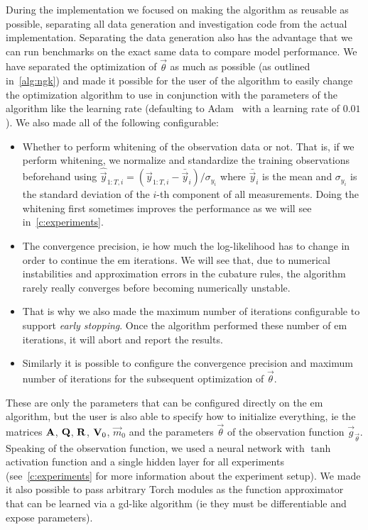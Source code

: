 	During the implementation we focused on making the algorithm as reusable as possible, separating all data generation and investigation code from the actual implementation. Separating the data generation also has the advantage that we can run benchmarks on the exact same data to compare model performance. We have separated the optimization of \(\vec{\theta}\) as much as possible (as outlined in~\autoref{alg:ngk}) and made it possible for the user of the algorithm to easily change the optimization algorithm to use in conjunction with the parameters of the algorithm like the learning rate (defaulting to Adam~\cite{kingmaAdamMethodStochastic2017} with a learning rate of \( 0.01 \)). We also made all of the following configurable:
	\begin{itemize}
		\item Whether to perform whitening of the observation data or not. That is, if we perform whitening, we normalize and standardize the training observations beforehand using \( \hat{\vec{y}}_{1:T, i} = (\vec{y}_{1:T, i} - \bar{\vec{y}}_i) / \sigma_{y_i} \) where \( \bar{\vec{y}}_i \) is the mean and \( \sigma_{y_i} \) is the standard deviation of the \(i\)-th component of all measurements. Doing the whitening first sometimes improves the performance as we will see in~\ref{c:experiments}.
		\item The convergence precision, \ac{ie} how much the log-likelihood has to change in order to continue the \ac{em} iterations. We will see that, due to numerical instabilities and approximation errors in the cubature rules, the algorithm rarely really converges before becoming numerically unstable.
		\item That is why we also made the maximum number of iterations configurable to support \emph{early stopping}. Once the algorithm performed these number of \ac{em} iterations, it will abort and report the results.
		\item Similarly it is possible to configure the convergence precision and maximum number of iterations for the subsequent optimization of \(\vec{\theta}\).
	\end{itemize}
	These are only the parameters that can be configured directly on the \ac{em} algorithm, but the user is also able to specify how to initialize everything, \ac{ie} the matrices \( \boldsymbol{\mathrm{A}} \), \( \boldsymbol{\mathrm{Q}} \), \( \boldsymbol{\mathrm{R}} \), \( \boldsymbol{\mathrm{V}}_0 \), \( \vec{m}_0 \) and the parameters \( \vec{\theta} \) of the observation function \( \vec{g}_{\vec{\theta}} \). Speaking of the observation function, we used a neural network with \( \tanh \) activation function and a single hidden layer for all experiments (see~\autoref{c:experiments} for more information about the experiment setup). We made it also possible to pass arbitrary Torch modules as the function approximator that can be learned via a \ac{gd}-like algorithm (\ac{ie} they must be differentiable and expose parameters).

